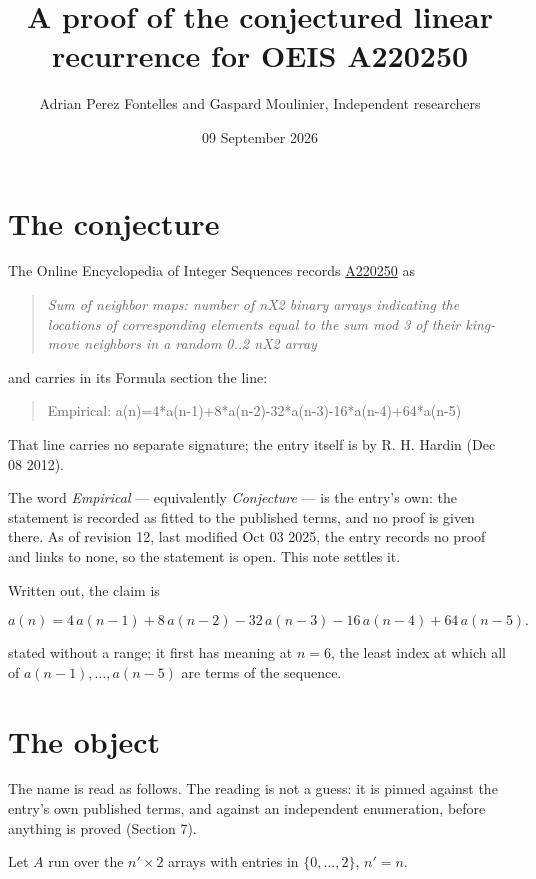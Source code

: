 \documentclass[11pt]{article}
\title{A proof of the conjectured linear recurrence for OEIS A220250}
\author{Adrian Perez Fontelles and Gaspard Moulinier, Independent researchers}
\date{09 September 2026}
\theoremstyle{definition}
\begin{document}
\maketitle
\section{The conjecture}

The Online Encyclopedia of Integer Sequences records \href{https://oeis.org/A220250}{A220250} as

\begin{quote}\itshape Sum of neighbor maps: number of nX2 binary arrays indicating the locations of corresponding elements equal to the sum mod 3 of their king-move neighbors in a random 0..2 nX2 array\end{quote}

and carries in its Formula section the line:

\begin{quote}\ttfamily Empirical: a(n)=4*a(n-1)+8*a(n-2)-32*a(n-3)-16*a(n-4)+64*a(n-5)\end{quote}

That line carries no separate signature; the entry itself is by R. H. Hardin (Dec 08 2012).

The word {\itshape Empirical} --- equivalently {\itshape Conjecture} --- is the entry's own: the statement is recorded as fitted to the published terms, and no proof is given there. As of revision 12, last modified Oct 03 2025, the entry records no proof and links to none, so the statement is open. This note settles it.

Written out, the claim is

\[a(n) = 4\,a(n-1) + 8\,a(n-2) - 32\,a(n-3) - 16\,a(n-4) + 64\,a(n-5).\]

stated without a range; it first has meaning at $n = 6$, the least index at which all of $a(n-1),\dots,a(n-5)$ are terms of the sequence.

\section{The object}

The name is read as follows. The reading is not a guess: it is pinned against the entry's own published terms, and against an independent enumeration, before anything is proved (Section 7).

Let $A$ run over the $n' \times 2$ arrays with entries in $\{0,\dots,2\}$, $n' = n$.
\end{document}
